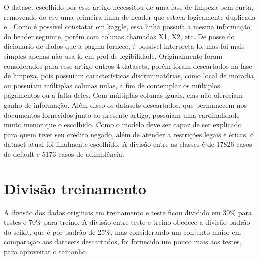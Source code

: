 \documentclass[12pt]{article}
\begin{document}
O dataset escolhido por esse artigo\cite{datasetM} necessitou de uma fase de limpeza bem curta, removendo do csv uma primeira linha de header que estava logicamente duplicada e . Como é possível constatar em kaggle\cite{kaggle}, essa linha possuía a mesma informação do header seguinte, porém com colunas chamadas X1, X2, etc. De posse do dicionario de dados que a pagina fornece, é possivel interpreta-lo, mas foi mais simples apenas não usa-lo em prol de legibilidade. Originalmente foram considerados para esse artigo outros 4 datasets, porém foram descartados na fase de limpeza, pois possuíam características discriminatórias, como local de moradia, ou possuíam múltiplas colunas nulas, a fim de contemplar os múltiplos pagamentos ou a falta deles. Com múltiplas colunas iguais, elas não ofereciam ganho de informação. Além disso os datasets descartados, que permanecem nos documentos fornecidos junto ao presente artigo, possuíam uma cardinalidade muito menor que o escolhido. Como o modelo deve ser capaz de ser explicado para quem tiver seu crédito negado, além de atender a restrições legais e éticas, o dataset atual foi finalmente escolhido. A divisão entre as classes é de 17826 casos de default e 5173 casos de adimplência.

\section{Divisão treinamento}

A divisão dos dados originais em treinamento e teste ficou dividido em 30\% para testes e 70\% para treino. A divisão entre teste e treino obedece a divisão padrão do scikit, que é por padrão de 25\%, mas considerando um conjunto maior em comparação aos datasets descartados, foi fornecido um pouco mais aos testes, para aproveitar o tamanho.
\end{document}
